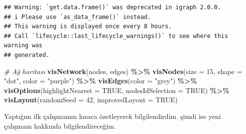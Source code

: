 \documentclass[
]{article}
\newenvironment{Shaded}{\begin{snugshade}}{\end{snugshade}}
\newcommand{\AttributeTok}[1]{\textcolor[rgb]{0.13,0.29,0.53}{#1}}
\newcommand{\CommentTok}[1]{\textcolor[rgb]{0.56,0.35,0.01}{\textit{#1}}}
\newcommand{\ConstantTok}[1]{\textcolor[rgb]{0.56,0.35,0.01}{#1}}
\newcommand{\DecValTok}[1]{\textcolor[rgb]{0.00,0.00,0.81}{#1}}
\newcommand{\FunctionTok}[1]{\textcolor[rgb]{0.13,0.29,0.53}{\textbf{#1}}}
\newcommand{\NormalTok}[1]{#1}
\newcommand{\OtherTok}[1]{\textcolor[rgb]{0.56,0.35,0.01}{#1}}
\newcommand{\SpecialCharTok}[1]{\textcolor[rgb]{0.81,0.36,0.00}{\textbf{#1}}}
\newcommand{\StringTok}[1]{\textcolor[rgb]{0.31,0.60,0.02}{#1}}
\begin{document}
\begin{Shaded}
\end{Shaded}

\begin{verbatim}
## Warning: `get.data.frame()` was deprecated in igraph 2.0.0.
## i Please use `as_data_frame()` instead.
## This warning is displayed once every 8 hours.
## Call `lifecycle::last_lifecycle_warnings()` to see where this warning was
## generated.
\end{verbatim}

\begin{Shaded}
\begin{Highlighting}[]
\CommentTok{\# Ağ haritası}
\FunctionTok{visNetwork}\NormalTok{(nodes, edges) }\SpecialCharTok{\%\textgreater{}\%}
  \FunctionTok{visNodes}\NormalTok{(}\AttributeTok{size =} \DecValTok{15}\NormalTok{, }\AttributeTok{shape =} \StringTok{"dot"}\NormalTok{, }\AttributeTok{color =} \StringTok{"purple"}\NormalTok{) }\SpecialCharTok{\%\textgreater{}\%}
  \FunctionTok{visEdges}\NormalTok{(}\AttributeTok{color =} \StringTok{"grey"}\NormalTok{) }\SpecialCharTok{\%\textgreater{}\%}
  \FunctionTok{visOptions}\NormalTok{(}\AttributeTok{highlightNearest =} \ConstantTok{TRUE}\NormalTok{, }\AttributeTok{nodesIdSelection =} \ConstantTok{TRUE}\NormalTok{) }\SpecialCharTok{\%\textgreater{}\%}
  \FunctionTok{visLayout}\NormalTok{(}\AttributeTok{randomSeed =} \DecValTok{42}\NormalTok{, }\AttributeTok{improvedLayout =} \ConstantTok{TRUE}\NormalTok{)}
\end{Highlighting}
\end{Shaded}

Yaptığım ilk çalışmamın kısaca özetleyerek bilgilendirdim. şimdi ise
yeni çalışmam hakkında bilgilendireceğim.
\end{document}
